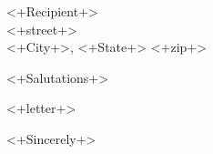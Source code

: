 \documentclass[12pt]{letter}
\begin{document}
\address{
<+street+> \\
<+City+>, <+State+> <+zip+>
}

\begin{letter}{
<+Recipient+> \\
<+street+> \\
<+City+>, <+State+> <+zip+>
}
\opening{<+Salutations+>}

<+letter+>

\closing{<+Sincerely+>}

\end{letter}
\end{document}
